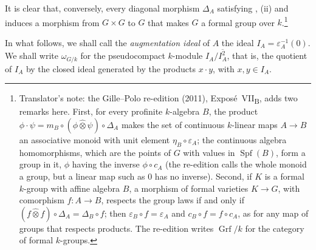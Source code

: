 It is clear that, conversely, every diagonal morphism \(\Delta_A\)
satisfying \textup{}, \textup{(ii)} and \textup{} induces a
morphism from \(G\times G\) to \(G\) that makes \(G\) a formal group
over \(k\).\footnote{Translator's note: the Gille--Polo re-edition (2011),
Exposé~VII\textsubscript{B}, adds two remarks here. First, for every profinite
\(k\)-algebra \(B\), the product
\(\phi\cdot\psi=m_B\circ(\phi\widehat\otimes\psi)\circ\Delta_A\) makes the set of
continuous \(k\)-linear maps \(A\to B\) an associative monoid with unit
element \(\eta_B\circ\varepsilon_A\); the continuous algebra homomorphisms,
which are the points of \(G\) with values in \(\operatorname{Spf}(B)\), form a
group in it, \(\phi\) having the inverse \(\phi\circ c_A\) (the re-edition
calls the whole monoid a group, but a linear map such as \(0\) has no inverse).
Second, if \(K\) is a formal \(k\)-group with affine algebra \(B\), a
morphism of formal varieties \(K\to G\), with comorphism \(f:A\to B\), respects
the group laws if and only if
\((f\widehat\otimes f)\circ\Delta_A=\Delta_B\circ f\); then
\(\varepsilon_B\circ f=\varepsilon_A\) and \(c_B\circ f=f\circ c_A\), as for
any map of groups that respects products. The re-edition writes
\(\operatorname{Grf}/k\) for the category of formal \(k\)-groups.}

In what follows, we shall call the \emph{augmentation ideal} of \(A\)
the ideal \(I_A=\varepsilon_A^{-1}(0)\). We shall write
\(\omega_{G/k}\) for the pseudocompact \(k\)-module
\(I_A/\overline{I_A^2}\), that is, the quotient of \(I_A\) by the
closed ideal generated by the products \(x\cdot y\), with
\(x,y\in I_A\).
